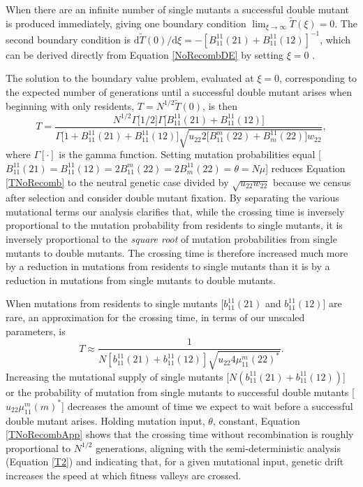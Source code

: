 \documentclass[review,3p,authoryear]{elsarticle}
\begin{document}
\begin{appendices}
When there are an infinite number of single mutants a successful double mutant is produced immediately, giving one boundary condition $\lim_{\xi\rightarrow\infty}\tilde{T}(\xi)=0$.
The second boundary condition is $\mathrm{d}\tilde{T}(0)/\mathrm{d}\xi = -[B_{11}^{11}(21) + B_{11}^{11}(12)]^{-1}$, which can be derived directly from Equation \eqref{NoRecombDE} by setting $\xi=0$ \citep[see appendix A in][for a more complete derivation]{Christiansen1998}.

The solution to the boundary value problem, evaluated at $\xi=0$, corresponding to the expected number of generations until a successful double mutant arises when beginning with only residents, $T=N^{1/2} \tilde{T}(0)$, is then
\begin{equation}\label{TNoRecomb}
T = \frac{ N^{1/2} \Gamma \Big[ 1/2 \Big] \Gamma \Big[ B_{11}^{11}(21) + B_{11}^{11}(12) \Big] } { \Gamma \Big[1 + B_{11}^{11}(21) + B_{11}^{11}(12) \Big] \sqrt{u_{22} 2\big[ B_{11}^{m}(22) + B_{m}^{11}(22) \big] w_{22}} },
\end{equation}
where $\Gamma [\cdot]$ is the gamma function.
Setting mutation probabilities equal [$B_{11}^{11}(21)=B_{11}^{11}(12)=2B_{11}^{m}(22)=2B_{m}^{11}(22)=\theta=N\mu$] reduces Equation \eqref{TNoRecomb} to the neutral genetic case \citep[equation 27 in][]{Christiansen1998} divided by $\sqrt{u_{22}w_{22}}$ because we census after selection and consider double mutant fixation.
By separating the various mutational terms our analysis clarifies that, while the crossing time is inversely proportional to the mutation probability from residents to single mutants, it is inversely proportional to the \textit{square root} of mutation probabilities from single mutants to double mutants.
The crossing time is therefore increased much more by a reduction in mutations from residents to single mutants than it is by a reduction in mutations from single mutants to double mutants.

When mutations from residents to single mutants [$b_{11}^{11}(21)$ and $b_{11}^{11}(12)$] are rare,
an approximation for the crossing time, in terms of our unscaled parameters, is
\begin{equation}\label{TNoRecombApp}
T \approx \frac{1}{N [b_{11}^{11}(21) + b_{11}^{11}(12)] \sqrt{u_{22}4\mu_{11}^{m}(22)^*}}.
\end{equation}
Increasing the mutational supply of single mutants [$N(b_{11}^{11}(21) + b_{11}^{11}(12))$] or the probability of mutation from single mutants to successful double mutants [$u_{22}\mu_{11}^{m}(m)^*$] decreases the amount of time we expect to wait before a successful double mutant arises.
Holding mutation input, $\theta$, constant, Equation \eqref{TNoRecombApp} shows that the crossing time without recombination is roughly proportional to $N^{1/2}$ generations, aligning with the semi-deterministic analysis (Equation \ref{T2}) and indicating that, for a given mutational input, genetic drift increases the speed at which fitness valleys are crossed.  


\end{appendices}
\end{document}
